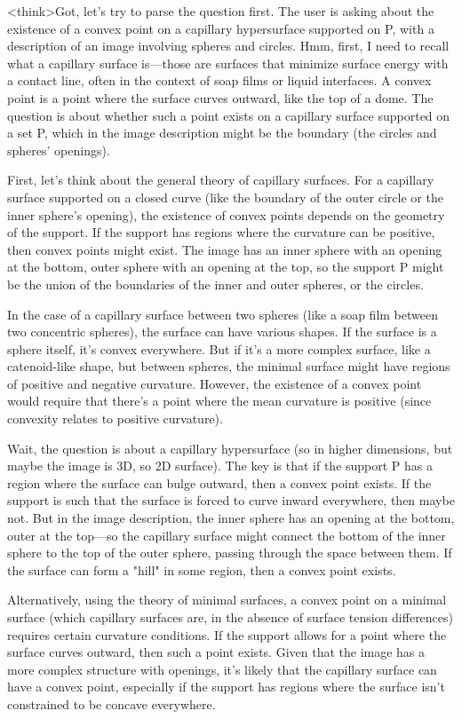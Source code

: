 <think>Got, let's try to parse the question first. The user is asking about the existence of a convex point on a capillary hypersurface supported on P, with a description of an image involving spheres and circles. Hmm, first, I need to recall what a capillary surface is—those are surfaces that minimize surface energy with a contact line, often in the context of soap films or liquid interfaces. A convex point is a point where the surface curves outward, like the top of a dome. The question is about whether such a point exists on a capillary surface supported on a set P, which in the image description might be the boundary (the circles and spheres' openings). 

First, let's think about the general theory of capillary surfaces. For a capillary surface supported on a closed curve (like the boundary of the outer circle or the inner sphere's opening), the existence of convex points depends on the geometry of the support. If the support has regions where the curvature can be positive, then convex points might exist. The image has an inner sphere with an opening at the bottom, outer sphere with an opening at the top, so the support P might be the union of the boundaries of the inner and outer spheres, or the circles. 

In the case of a capillary surface between two spheres (like a soap film between two concentric spheres), the surface can have various shapes. If the surface is a sphere itself, it's convex everywhere. But if it's a more complex surface, like a catenoid-like shape, but between spheres, the minimal surface might have regions of positive and negative curvature. However, the existence of a convex point would require that there's a point where the mean curvature is positive (since convexity relates to positive curvature). 

Wait, the question is about a capillary hypersurface (so in higher dimensions, but maybe the image is 3D, so 2D surface). The key is that if the support P has a region where the surface can bulge outward, then a convex point exists. If the support is such that the surface is forced to curve inward everywhere, then maybe not. But in the image description, the inner sphere has an opening at the bottom, outer at the top—so the capillary surface might connect the bottom of the inner sphere to the top of the outer sphere, passing through the space between them. If the surface can form a "hill" in some region, then a convex point exists. 

Alternatively, using the theory of minimal surfaces, a convex point on a minimal surface (which capillary surfaces are, in the absence of surface tension differences) requires certain curvature conditions. If the support allows for a point where the surface curves outward, then such a point exists. Given that the image has a more complex structure with openings, it's likely that the capillary surface can have a convex point, especially if the support has regions where the surface isn't constrained to be concave everywhere. 

